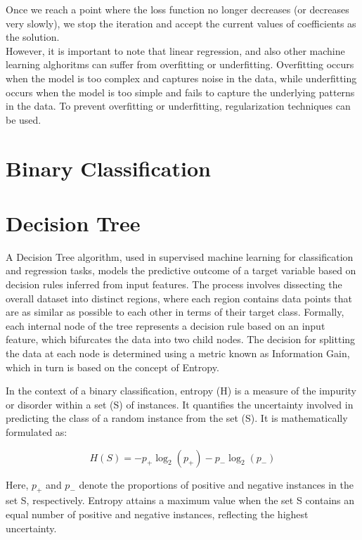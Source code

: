 Once we reach a point where the loss function no longer decreases (or decreases very slowly), we stop the iteration and accept the current values of coefficients as the solution.
\\

However, it is important to note that linear regression, and also other machine learning alghoritms can suffer from overfitting or underfitting. Overfitting occurs when the model is too complex and captures noise in the data, while underfitting occurs when the model is too simple and fails to capture the underlying patterns in the data. To prevent overfitting or underfitting, regularization techniques can be used.

\newpage

\section{Binary Classification}

\section{Decision Tree}
A Decision Tree algorithm, used in supervised machine learning for classification and regression tasks, models the predictive outcome of a target variable based on decision rules inferred from input features. The process involves dissecting the overall dataset into distinct regions, where each region contains data points that are as similar as possible to each other in terms of their target class. Formally, each internal node of the tree represents a decision rule based on an input feature, which bifurcates the data into two child nodes. The decision for splitting the data at each node is determined using a metric known as Information Gain, which in turn is based on the concept of Entropy.

In the context of a binary classification, entropy (H) is a measure of the impurity or disorder within a set (S) of instances. It quantifies the uncertainty involved in predicting the class of a random instance from the set (S). It is mathematically formulated as:

\begin{equation}
	H(S) = - p_{+} \log_{2}(p_{+}) - p_{-} \log_{2}(p_{-})
\end{equation}

Here, $p_+$ and $p_-$ denote the proportions of positive and negative instances in the set S, respectively. Entropy attains a maximum value when the set S contains an equal number of positive and negative instances, reflecting the highest uncertainty.

